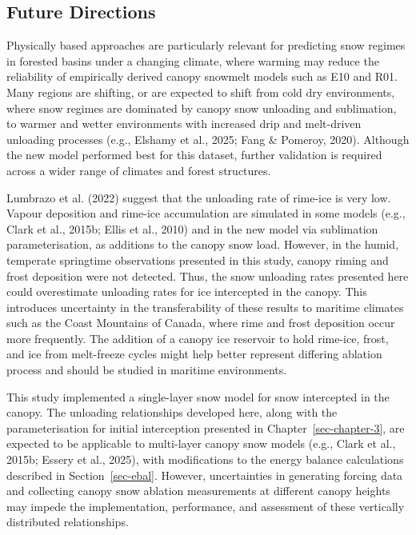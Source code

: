 \documentclass[
  letterpaper,
]{tex/uofsthesis-cs}
\begin{document}
\subsection{Future Directions}\label{future-directions}

Physically based approaches are particularly relevant for predicting
snow regimes in forested basins under a changing climate, where warming
may reduce the reliability of empirically derived canopy snowmelt models
such as E10 and R01. Many regions are shifting, or are expected to shift
from cold dry environments, where snow regimes are dominated by canopy
snow unloading and sublimation, to warmer and wetter environments with
increased drip and melt-driven unloading processes (e.g., Elshamy et
al., 2025; Fang \& Pomeroy, 2020). Although the new model performed best
for this dataset, further validation is required across a wider range of
climates and forest structures.

Lumbrazo et al. (2022) suggest that the unloading rate of rime-ice is
very low. Vapour deposition and rime-ice accumulation are simulated in
some models (e.g., Clark et al., 2015b; Ellis et al., 2010) and in the
new model via sublimation parameterisation, as additions to the canopy
snow load. However, in the humid, temperate springtime observations
presented in this study, canopy riming and frost deposition were not
detected. Thus, the snow unloading rates presented here could
overestimate unloading rates for ice intercepted in the canopy. This
introduces uncertainty in the transferability of these results to
maritime climates such as the Coast Mountains of Canada, where rime and
frost deposition occur more frequently. The addition of a canopy ice
reservoir to hold rime-ice, frost, and ice from melt-freeze cycles might
help better represent differing ablation process and should be studied
in maritime environments.

This study implemented a single-layer snow model for snow intercepted in
the canopy. The unloading relationships developed here, along with the
parameterisation for initial interception presented in
Chapter~\ref{sec-chapter-3}, are expected to be applicable to
multi-layer canopy snow models (e.g., Clark et al., 2015b; Essery et
al., 2025), with modifications to the energy balance calculations
described in Section~\ref{sec-ebal}. However, uncertainties in
generating forcing data and collecting canopy snow ablation measurements
at different canopy heights may impede the implementation, performance,
and assessment of these vertically distributed relationships.
\end{document}
